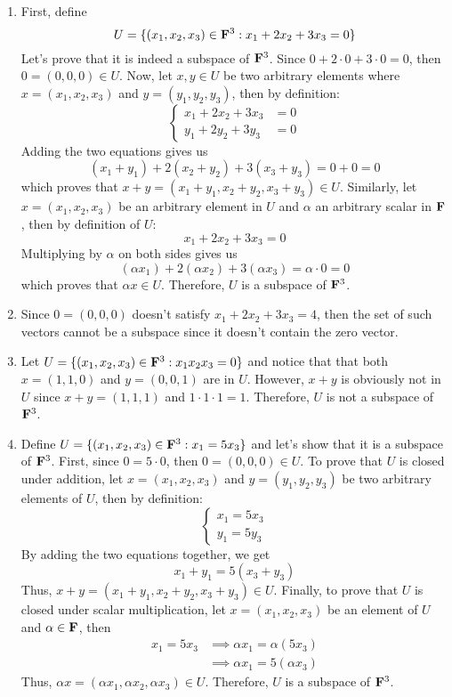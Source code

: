 \begin{solution}
    \begin{enumerate}[label=(\alph*)]
        \item First, define
        $$U = \{(x_1,x_2,x_3)\in \mathbf{F}^3 : x_1 + 2x_2 + 3x_3  = 0\}$$
        Let's prove that it is indeed a subspace of $\mathbf{F}^3$. Since $0 + 2\cdot 0 + 3 \cdot 0 = 0$, then $0 = (0,0,0) \in U$. Now, let $x, y \in U$ be two arbitrary elements where $x = (x_1, x_2,x_3)$ and $y = (y_1, y_2, y_3)$, then by definition:
        $$\begin{cases}
            x_1 + 2x_2 + 3x_3  &= 0 \\
            y_1 + 2y_2 + 3y_3  &= 0
        \end{cases}$$
        Adding the two equations gives us
        $$(x_1 + y_1) + 2(x_2 + y_2) + 3(x_3 + y_3) = 0 + 0 = 0$$
        which proves that $x + y = (x_1 + y_1, x_2 + y_2, x_3 + y_3) \in U$. Similarly, let $x = (x_1, x_2, x_3)$ be an arbitrary element in $U$ and $\alpha$ an arbitrary scalar in $\mathbf{F}$, then by definition of $U$:
        $$x_1 + 2x_2 + 3x_3 = 0 $$
        Multiplying by $\alpha$ on both sides gives us
        $$(\alpha x_1) + 2(\alpha x_2) + 3(\alpha x_3) = \alpha \cdot 0 = 0 $$
        which proves that $\alpha x \in U$. Therefore, $U$ is a subspace of $\mathbf{F}^3$.
        \item  Since $0 = (0,0,0)$ doesn't satisfy $x_1 + 2x_2 + 3x_3 = 4$, then the set of such vectors cannot be a subspace since it doesn't contain the zero vector.
        \item Let $U = \{(x_1,x_2,x_3)\in \mathbf{F}^3 : x_1 x_2 x_3  = 0\}$ and notice that that both $x = (1,1,0)$ and $y = (0,0,1)$ are in $U$. However, $x + y$ is obviously not in $U$ since $x + y = (1,1,1)$ and $1 \cdot 1 \cdot 1 = 1$. Therefore, $U$ is not a subspace of $\mathbf{F}^3$.
        \item Define $U = \{(x_1,x_2,x_3)\in \mathbf{F}^3 : x_1 = 5x_3\}$ and let's show that it is a subspace of $\mathbf{F}^3$. First, since $0 = 5 \cdot 0$, then $0 = (0,0,0) \in U$. To prove that $U$ is closed under addition, let $x = (x_1, x_2, x_3)$ and $y=(y_1, y_2, y_3)$ be two arbitrary elements of $U$, then by definition:
        $$\begin{cases}
            x_1 = 5 x_3 \\
            y_1 = 5 y_3
        \end{cases}$$
        By adding the two equations together, we get
        $$x_1 + y_1 = 5(x_3 + y_3)$$
        Thus, $x + y = (x_1 + y_1, x_2 + y_2, x_3 + y_3) \in U$. Finally, to prove that $U$ is closed under scalar multiplication, let $x = (x_1, x_2, x_3)$ be an element of $U$ and $\alpha \in \mathbf{F}$, then
        \begin{align*}
            x_1 = 5x_3 &\implies \alpha x_1 = \alpha(5x_3) \\
            &\implies \alpha x_1 = 5 (\alpha x_3)
        \end{align*}
        Thus, $\alpha x = (\alpha x_1, \alpha x_2, \alpha x_3) \in U$. Therefore, $U$ is a subspace of $\mathbf{F}^3$. \\
    \end{enumerate}
\end{solution}

